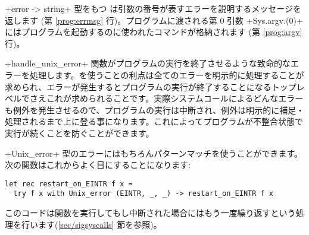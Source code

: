 \ml+error -> string+ 型をもつ  は引数の番号が表すエラーを説明するメッセージを返します (第 \ref{prog:errmsg} 行)。プログラムに渡される第 0 引数 \ml+Sys.argv.(0)+ にはプログラムを起動するのに使われたコマンドが格納されます (第 \ref{prog:argv} 行)。

\ml+handle_unix_error+ 関数がプログラムの実行を終了させるような致命的なエラーを処理します。\ocaml を使うことの利点は全てのエラーを明示的に処理することが求められ、エラーが発生するとプログラムの実行が終了することになるトップレベルでさえこれが求められることです。実際システムコールによるどんなエラーも例外を発生させるので、プログラムの実行は中断され、例外は明示的に補足・処理されるまで上に登る事になります。これによってプログラムが不整合状態で実行が続くことを防ぐことができます。

\ml+Unix_error+ 型のエラーにはもちろんパターンマッチを使うことができます。次の関数はこれからよく目にすることになります:
%
\begin{lstlisting}
let rec restart_on_EINTR f x =
  try f x with Unix_error (EINTR, _, _) -> restart_on_EINTR f x
\end{lstlisting}
%
このコードは関数を実行してもし中断された場合にはもう一度繰り返すという処理を行います(\ref{sec/sigsyscalls} 節を参照)。

